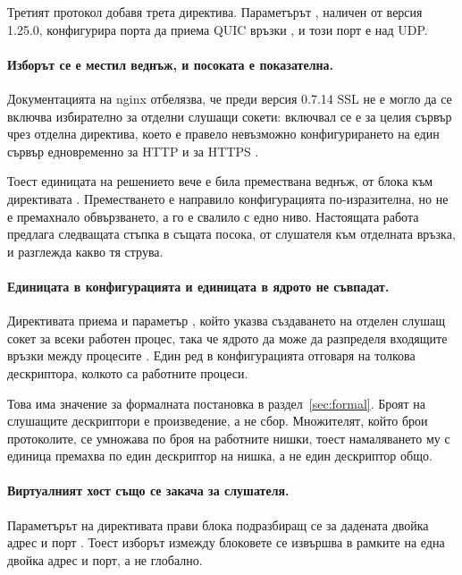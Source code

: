 Третият протокол добавя трета директива. Параметърът , наличен от версия 1.25.0,
конфигурира порта да приема QUIC връзки \cite{nginxlisten}, и този порт е над UDP.

\paragraph{Изборът се е местил веднъж, и посоката е показателна.} Документацията на nginx
отбелязва, че преди версия 0.7.14 SSL не е могло да се включва избирателно за отделни слушащи
сокети: включвал се е за целия сървър чрез отделна директива, което е правело невъзможно
конфигурирането на един сървър едновременно за HTTP и за HTTPS \cite{nginxhttps}.

Тоест единицата на решението вече е била премествана веднъж, от блока  към
директивата . Преместването е направило конфигурацията по-изразителна, но не е
премахнало обвързването, а го е свалило с едно ниво. Настоящата работа предлага следващата
стъпка в същата посока, от слушателя към отделната връзка, и разглежда какво тя струва.

\paragraph{Единицата в конфигурацията и единицата в ядрото не съвпадат.} Директивата
 приема и параметър , който указва създаването на отделен слушащ
сокет за всеки работен процес, така че ядрото да може да разпределя входящите връзки между
процесите \cite{nginxlisten}. Един ред в конфигурацията отговаря на толкова дескриптора,
колкото са работните процеси.

Това има значение за формалната постановка в раздел~\ref{sec:formal}. Броят на слушащите
дескриптори е произведение, а не сбор. Множителят, който брои протоколите, се умножава по броя
на работните нишки, тоест намаляването му с единица премахва по един дескриптор на нишка, а не
един дескриптор общо.

\paragraph{Виртуалният хост също се закача за слушателя.} Параметърът  на
директивата  прави блока подразбиращ се за дадената двойка адрес и порт
\cite{nginxlisten}. Тоест изборът измежду блоковете  се извършва в рамките на една
двойка адрес и порт, а не глобално.

